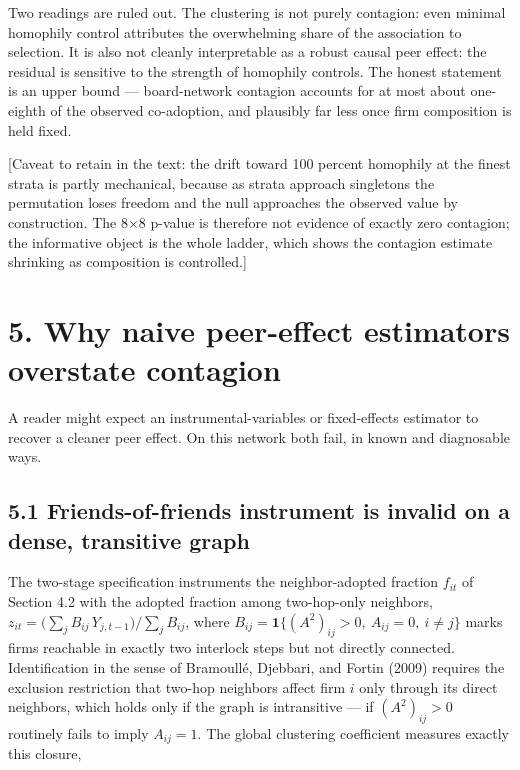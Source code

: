 \documentclass[
  a4paper,
]{article}
\begin{document}
Two readings are ruled out. The clustering is not purely contagion: even
minimal homophily control attributes the overwhelming share of the
association to selection. It is also not cleanly interpretable as a
robust causal peer effect: the residual is sensitive to the strength of
homophily controls. The honest statement is an upper bound ---
board-network contagion accounts for at most about one-eighth of the
observed co-adoption, and plausibly far less once firm composition is
held fixed.

{[}Caveat to retain in the text: the drift toward 100 percent homophily
at the finest strata is partly mechanical, because as strata approach
singletons the permutation loses freedom and the null approaches the
observed value by construction. The 8×8 p-value is therefore not
evidence of exactly zero contagion; the informative object is the whole
ladder, which shows the contagion estimate shrinking as composition is
controlled.{]}

\section{5. Why naive peer-effect estimators overstate
contagion}\label{why-naive-peer-effect-estimators-overstate-contagion}

A reader might expect an instrumental-variables or fixed-effects
estimator to recover a cleaner peer effect. On this network both fail,
in known and diagnosable ways.

\subsection{5.1 Friends-of-friends instrument is invalid on a dense,
transitive
graph}\label{friends-of-friends-instrument-is-invalid-on-a-dense-transitive-graph}

The two-stage specification instruments the neighbor-adopted fraction
\(f_{it}\) of Section 4.2 with the adopted fraction among two-hop-only
neighbors,
\(z_{it} = \big(\sum_j B_{ij}\, Y_{j,t-1}\big) / \sum_j B_{ij}\), where
\(B_{ij} = \mathbf{1}\{(A^2)_{ij} > 0,\ A_{ij} = 0,\ i \ne j\}\) marks
firms reachable in exactly two interlock steps but not directly
connected. Identification in the sense of Bramoullé, Djebbari, and
Fortin (2009) requires the exclusion restriction that two-hop neighbors
affect firm \(i\) only through its direct neighbors, which holds only if
the graph is intransitive --- if \((A^2)_{ij} > 0\) routinely fails to
imply \(A_{ij} = 1\). The global clustering coefficient measures exactly
this closure,
\end{document}
